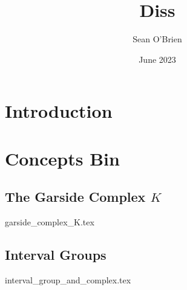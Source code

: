 \documentclass{article}
\title{Diss}
\author{Sean O'Brien}
\date{June 2023}
\begin{document}
\maketitle

\section{Introduction}

\section{Concepts Bin}
\subsection{The Garside Complex $K$}
{garside_complex_K.tex}
\subsection{Interval Groups}
{interval_group_and_complex.tex}

\printbibliography
\end{document}
